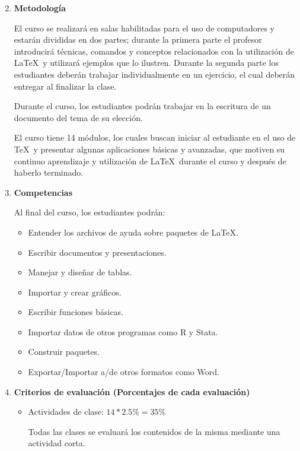 \documentclass[11pt]{article}
\begin{document}
\begin{enumerate}
\begin{multicols}{2}
\begin{enumerate}[start=1,label={\bfseries \arabic*.},leftmargin=1cm]
\end{enumerate}
\end{multicols}


\item \textbf{Metodología}

El curso se realizará en salas habilitadas para el uso de computadores y estarán divididas en dos partes; durante la primera parte el profesor introducirá técnicas, comandos y conceptos relacionados con la utilización de \LaTeX\ y utilizará ejemplos que lo ilustren. Durante la segunda parte los estudiantes deberán trabajar individualmente en un ejercicio, el cual deberán entregar al finalizar la clase.

Durante el curso, los estudiantes podrán trabajar en la escritura de un documento del tema de su elección. 

El curso tiene 14 módulos, los cuales buscan iniciar al estudiante en el uso de \TeX\ y presentar algunas aplicaciones básicas y avanzadas, que motiven su continuo aprendizaje y utilización de \LaTeX\ durante el curso y después de haberlo terminado.


\item \textbf{Competencias }
  
  Al final del curso, los estudiantes podrán:
\begin{itemize}
    \item Entender los archivos de ayuda sobre paquetes de \LaTeX.
    \item Escribir documentos y presentaciones.
    \item Manejar y diseñar de tablas.
    \item Importar y crear gráficos.
    \item Escribir funciones básicas.
    \item Importar datos de otros programas como R y Stata.
    \item Construir paquetes.
    \item Exportar/Importar a/de otros formatos como Word.
\end{itemize}

\item \textbf{Criterios de evaluación (Porcentajes de cada evaluación)}
\begin{itemize}
    \item Actividades de clase: $14*2.5\%=35\%$
    
    Todas las clases se evaluará los contenidos de la misma mediante una actividad corta. \\
    

\end{itemize}
\end{enumerate}
\end{document}

